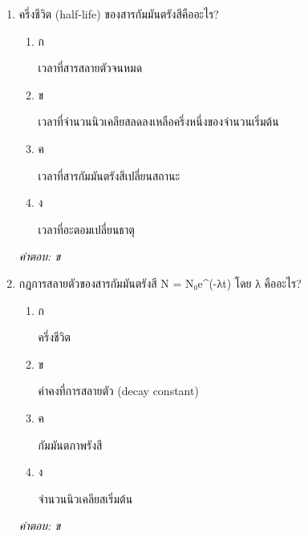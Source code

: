 \documentclass[12pt]{article}
\begin{document}
\begin{enumerate}[label=\arabic*., itemsep=0.5\baselineskip, topsep=0.5\baselineskip, leftmargin=*]
\item ครึ่งชีวิต (half-life) ของสารกัมมันตรังสีคืออะไร?
\begin{enumerate}[label=\alph*)., itemsep=0.3\baselineskip, topsep=0.3\baselineskip]
\item ก\ 
\begin{minipage}[t]{0.9\linewidth}
\raggedright เวลาที่สารสลายตัวจนหมด
\end{minipage}
\item ข\ 
\begin{minipage}[t]{0.9\linewidth}
\raggedright เวลาที่จำนวนนิวเคลียสลดลงเหลือครึ่งหนึ่งของจำนวนเริ่มต้น
\end{minipage}
\item ค\ 
\begin{minipage}[t]{0.9\linewidth}
\raggedright เวลาที่สารกัมมันตรังสีเปลี่ยนสถานะ
\end{minipage}
\item ง\ 
\begin{minipage}[t]{0.9\linewidth}
\raggedright เวลาที่อะตอมเปลี่ยนธาตุ
\end{minipage}
\end{enumerate}
\vspace{-0.3\baselineskip}
\begin{small}
\textit{คำตอบ: ข}
\end{small}

\item กฎการสลายตัวของสารกัมมันตรังสี N = N₀e\textasciicircum{}(-λt) โดย λ คืออะไร?
\begin{enumerate}[label=\alph*)., itemsep=0.3\baselineskip, topsep=0.3\baselineskip]
\item ก\ 
\begin{minipage}[t]{0.9\linewidth}
\raggedright ครึ่งชีวิต
\end{minipage}
\item ข\ 
\begin{minipage}[t]{0.9\linewidth}
\raggedright ค่าคงที่การสลายตัว (decay constant)
\end{minipage}
\item ค\ 
\begin{minipage}[t]{0.9\linewidth}
\raggedright กัมมันตภาพรังสี
\end{minipage}
\item ง\ 
\begin{minipage}[t]{0.9\linewidth}
\raggedright จำนวนนิวเคลียสเริ่มต้น
\end{minipage}
\end{enumerate}
\vspace{-0.3\baselineskip}
\begin{small}
\textit{คำตอบ: ข}
\end{small}


\end{enumerate}
\end{document}
